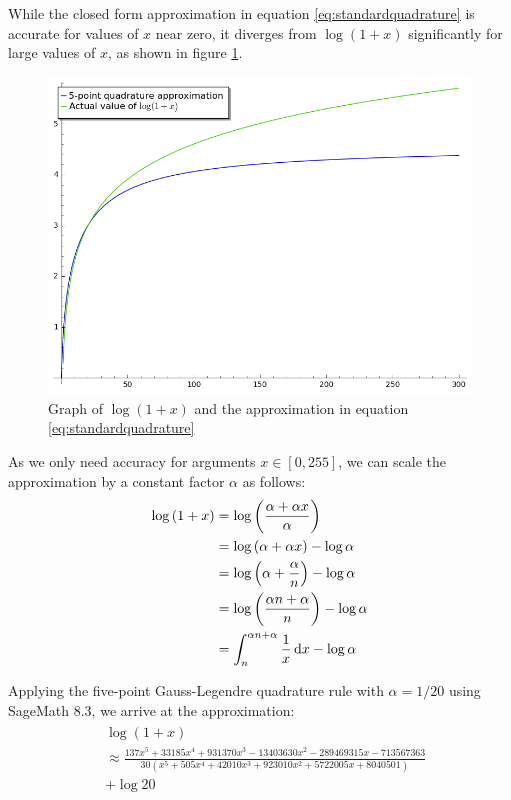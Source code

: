 While the closed form approximation in equation \ref{eq:standardquadrature} is accurate for values of $x$ near zero, it diverges from $\log{(1+x)}$ significantly for large values of $x$, as shown in figure \ref{fig:standardquadrature}.
\begin{figure}[!ht]
    \centering
    \includegraphics[width=.8\linewidth]{figures/StandardQuadrature.png}
    \caption{Graph of $\log{(1+x)}$ and the approximation in equation \ref{eq:standardquadrature}}
    \label{fig:standardquadrature}
\end{figure}

As we only need accuracy for arguments $x \in [0, 255]$, we can scale the approximation by a constant factor $\alpha$ as follows:
\begin{align*}
  \log{(1+x)} &= \log{\left(\frac{\alpha + \alpha x}{\alpha}\right)}\\
  &= \log{(\alpha + \alpha x)} - \log{\alpha}\\
  &= \log{\left(\alpha+\frac{\alpha}{n}\right)} - \log{\alpha}\\
  &= \log{\left(\frac{\alpha n + \alpha}{n}\right)} - \log{\alpha}\\
  &= \int_{n}^{\alpha n + \alpha}{\frac{1}{x}\mathop{}\!\mathrm{d} x} - \log{\alpha}
\end{align*}

Applying the five-point Gauss-Legendre quadrature rule with $\alpha = 1/20$ using SageMath 8.3, we arrive at the approximation:
\begin{align}\label{eq:scaledquadrature}
  \begin{split}
    &\log(1+x) \\
    &\approx \frac{137x^5 + 33185x^4 + 931370x^3 - 13403630x^2 - 289469315x - 713567363}
    {30(x^5 + 505x^4 + 42010x^3 + 923010x^2 + 5722005x + 8040501)} \\
    &+ \log{20}
  \end{split}
\end{align}

